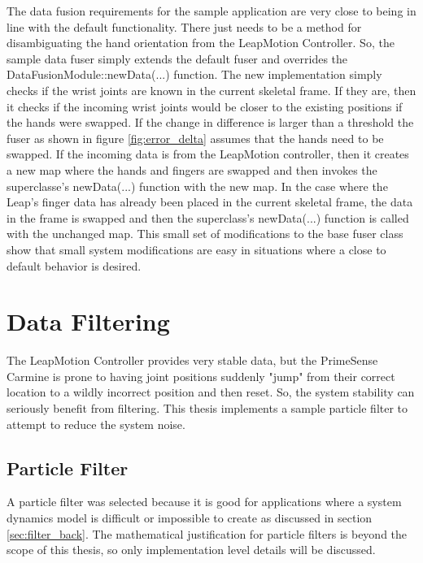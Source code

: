 The data fusion requirements for the sample application are very close to being in line with the default functionality. There just needs to be a method for disambiguating the hand orientation from the LeapMotion Controller. So, the sample data fuser simply extends the default fuser and overrides the DataFusionModule::newData(...) function. The new implementation simply checks if the wrist joints are known in the current skeletal frame. If they are, then it checks if the incoming wrist joints would be closer to the existing positions if the hands were swapped. If the change in difference is larger than a threshold the fuser as shown in figure \ref{fig:error_delta} assumes that the hands need to be swapped. If the incoming data is from the LeapMotion controller, then it creates a new map where the hands and fingers are swapped and then invokes the superclasse's newData(...) function with the new map. In the case where the Leap's finger data has already been placed in the current skeletal frame, the data in the frame is swapped and then the superclass's newData(...) function is called with the unchanged map. This small set of modifications to the base fuser class show that small system modifications are easy in situations where a close to default behavior is desired.

\section{Data Filtering}

The LeapMotion Controller provides very stable data, but the PrimeSense Carmine is prone to having joint positions suddenly "jump" from their correct location to a wildly incorrect position and then reset. So, the system stability can seriously benefit from filtering. This thesis implements a sample particle filter to attempt to reduce the system noise.

\subsection{Particle Filter}\label{sec:filter_impl}

A particle filter was selected because it is good for applications where a system dynamics model is difficult or impossible to create as discussed in section \ref{sec:filter_back}. The mathematical justification for particle filters is beyond the scope of this thesis, so only implementation level details will be discussed.

